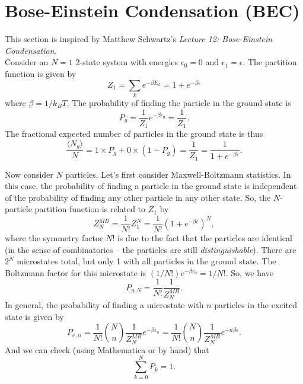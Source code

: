\documentclass{book}
\theoremstyle{definition}
\newcommand{\be}{\beta}
\newcommand{\f}[2]{\frac{#1}{#2}}
\begin{document}
\section*{Bose-Einstein Condensation (BEC)}


This section is inspired by Matthew Schwartz's \textit{Lecture 12: Bose-Einstein Condensation}. \\


Consider an $N=1$ 2-state system with energies $\epsilon_0=0$ and $\epsilon_1 = \epsilon$. The partition function is given by 
\begin{equation*}
Z_1 = \sum_k e^{-\beta E_k} = 1 + e^{-\be \epsilon}
\end{equation*}
where $\beta = 1/k_B T$. The probability of finding the particle in the ground state is 
\begin{equation*}
P_g = \f{1}{Z_1} e^{-\be\epsilon_0} = \f{1}{Z_1}. 
\end{equation*}
The fractional expected number of particles in the ground state is thus 
\begin{equation*}
\f{\langle N_g \rangle}{N} = 1\times P_g + 0\times (1-P_g) = \f{1}{Z_1} = \f{1}{1+e^{-\beta \epsilon}}. 
\end{equation*}


Now consider $N$ particles. Let's first consider Maxwell-Boltzmann statistics. In this case, the probability of finding a particle in the ground state is independent of the probability of finding any other particle in any other state. So, the $N$-particle partition function is related to $Z_1$ by 
\begin{equation*}
Z_N^{MB} = \f{1}{N!} Z_1^N = \f{1}{N!}\left(1+e^{-\be \epsilon}\right)^N,
\end{equation*}
where the symmetry factor $N!$ is due to the fact that the particles are identical (in the sense of combinatorics -- the particles are still \textit{distinguishable}). There are $2^N$ microstates total, but only 1 with all particles in the ground state. The Boltzmann factor for this microstate is $(1/N!)e^{-\beta\epsilon_0} = 1/N!$. So, we have
\begin{equation*}
P_{g,N} = \f{1}{N!} \f{1}{Z_N^{MB}}.
\end{equation*}
In general, the probability of finding a microstate with $n$ particles in the excited state is given by 
\begin{equation*}
P_{e,n} = \f{1}{N!}{N \choose {n}} \f{1}{Z_N^{MB}} e^{-\beta \epsilon_n} = \f{1}{N!}{N \choose {n}} \f{1}{Z_N^{MB}} e^{-n\beta \epsilon}.
\end{equation*}
And we can check (using Mathematica or by hand) that
\begin{equation*}
\sum_{k=0}^{N} P_k =1. 
\end{equation*}
\end{document}
